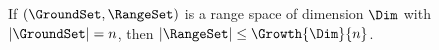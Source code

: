 \begin{lemma}
        If $(\GroundSet,\RangeSet)$ is a range space of \VC dimension
        $\Dim$ with $|\GroundSet| = n$, then $|\RangeSet| \leq
        \Growth{\Dim}{n}$.        
    \end{lemma}
